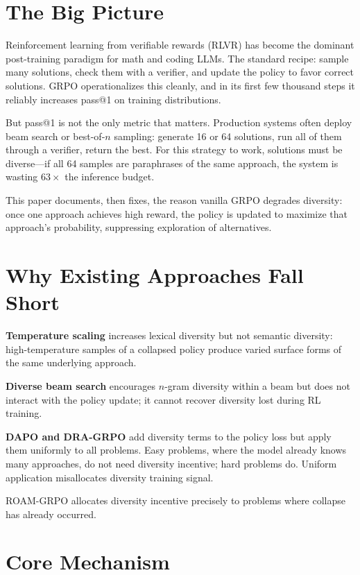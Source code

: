 \documentclass[10pt,twocolumn]{article}
\begin{document}
\section{The Big Picture}

Reinforcement learning from verifiable rewards (RLVR) has become the dominant post-training paradigm for math and coding LLMs.
The standard recipe: sample many solutions, check them with a verifier, and update the policy to favor correct solutions.
GRPO operationalizes this cleanly, and in its first few thousand steps it reliably increases pass@1 on training distributions.

But pass@1 is not the only metric that matters.
Production systems often deploy beam search or best-of-$n$ sampling: generate 16 or 64 solutions, run all of them through a verifier, return the best.
For this strategy to work, solutions must be diverse---if all 64 samples are paraphrases of the same approach, the system is wasting $63 \times$ the inference budget.

This paper documents, then fixes, the reason vanilla GRPO degrades diversity: once one approach achieves high reward, the policy is updated to maximize that approach's probability, suppressing exploration of alternatives.

\section{Why Existing Approaches Fall Short}

\textbf{Temperature scaling} increases lexical diversity but not semantic diversity: high-temperature samples of a collapsed policy produce varied surface forms of the same underlying approach.

\textbf{Diverse beam search} encourages $n$-gram diversity within a beam but does not interact with the policy update; it cannot recover diversity lost during RL training.

\textbf{DAPO and DRA-GRPO} add diversity terms to the policy loss but apply them uniformly to all problems.
Easy problems, where the model already knows many approaches, do not need diversity incentive; hard problems do.
Uniform application misallocates diversity training signal.

ROAM-GRPO allocates diversity incentive precisely to problems where collapse has already occurred.

\section{Core Mechanism}
\end{document}
